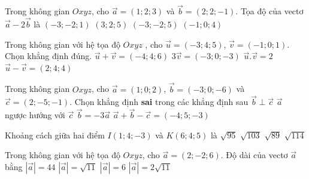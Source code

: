 \begin{ex}%
Trong không gian $Oxyz$, cho $\overrightarrow{a}=(1;2;3)$ và $\overrightarrow{b}=(2;2;-1)$. Tọa độ của vectơ $\overrightarrow{a}-2\overrightarrow{b}$ là
	\choice
	{$(-3;-2;1)$}
	{$(3;2;5)$}
	{\True $(-3;-2;5)$}
	{$(-1;0;4)$}
\end{ex}

\begin{ex}%
	Trong không gian với hệ tọa độ $Oxyz$ , cho $\overrightarrow{u}=(-3;4;5)$, $\overrightarrow{v}=(-1;0;1)$. Chọn khẳng định đúng.
	\choice
	{\True $\overrightarrow{u}+\overrightarrow{v}=(-4;4;6)$}
	{$3\overrightarrow{v}=(-3;0;-3)$}
	{$\overrightarrow{u}.\overrightarrow{v}=2$}
	{$\overrightarrow{u}-\overrightarrow{v}=(2;4;4)$}
\end{ex}

\begin{ex}%
	Trong không gian $Oxyz$, cho $\overrightarrow{a}=(1;0;2)$, $\overrightarrow{b}=(-3;0;-6)$ và $\overrightarrow{c}=(2;-5;-1).$ Chọn khẳng định \textbf{sai} trong các khẳng định sau
	\choice
	{$\overrightarrow{b}\perp\overrightarrow{c}$}
	{\True $\overrightarrow{a}$ ngược hướng với $\overrightarrow{c}$}
	{$\overrightarrow{b}=-3\overrightarrow{a}$}
	{$\overrightarrow{a}+\overrightarrow{b}-\overrightarrow{c}=(-4;5;-3)$}
\end{ex}

\begin{ex}%
	Khoảng cách giữa hai điểm $I(1;4;-3)$ và $K(6;4;5)$ là
	\choice
	{$\sqrt{95}$}
	{$\sqrt{103}$}
	{\True $\sqrt{89}$}
	{$\sqrt{114}$}
\end{ex}

\begin{ex}%
	Trong không gian với hệ tọa độ $Oxyz$, cho $\overrightarrow{a}=(2;-2;6)$. Độ dài của vectơ $\overrightarrow{a}$ bằng
	\choice
	{$\left|\overrightarrow{a}\right|=44$}
	{$\left|\overrightarrow{a}\right|=\sqrt{11}$}
	{$\left|\overrightarrow{a}\right|=6$}
	{\True $\left|\overrightarrow{a}\right|=2\sqrt{11}$}
\end{ex}

